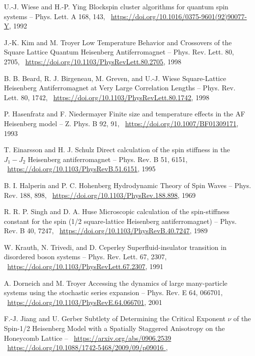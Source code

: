 \documentclass[11pt]{article}
\begin{document}
\begin{thebibliography}{3}
U.-J. Wiese and H.-P. Ying Blockspin cluster algorithms for quantum spin systems -- Phys. Lett. A 168, 143,  ~\url{https://doi.org/10.1016/0375-9601(92)90077-Y}, 1992

J.-K. Kim and M. Troyer Low Temperature Behavior and Crossovers of the Square Lattice Quantum Heisenberg Antiferromagnet -- Phys. Rev. Lett. 80, 2705,  ~\url{https://doi.org/10.1103/PhysRevLett.80.2705}, 1998

B. B. Beard, R. J. Birgeneau, M. Greven, and U.-J. Wiese Square-Lattice Heisenberg Antiferromagnet at Very Large Correlation Lengths -- Phys. Rev. Lett. 80, 1742,  ~\url{https://doi.org/10.1103/PhysRevLett.80.1742}, 1998

P. Hasenfratz and F. Niedermayer Finite size and temperature effects in the AF Heisenberg model -- Z. Phys. B 92, 91,  ~\url{https://doi.org/10.1007/BF01309171}, 1993

T. Einarsson and H. J. Schulz Direct calculation of the spin stiffness in the $J_1-J_2$ Heisenberg antiferromagnet -- Phys. Rev. B 51, 6151,  ~\url{https://doi.org/10.1103/PhysRevB.51.6151}, 1995

B. I. Halperin and P. C. Hohenberg Hydrodynamic Theory of Spin Waves -- Phys. Rev. 188, 898,  ~\url{https://doi.org/10.1103/PhysRev.188.898}, 1969

R. R. P. Singh and D. A. Huse Microscopic calculation of the spin-stiffness constant for the spin (1/2 square-lattice Heisenberg antiferromagnet) -- Phys. Rev. B 40, 7247,  ~\url{https://doi.org/10.1103/PhysRevB.40.7247}, 1989

W. Krauth, N. Trivedi, and D. Ceperley 
Superfluid-insulator transition in disordered boson systems -- Phys. Rev. Lett. 67, 2307,  ~\url{https://doi.org/10.1103/PhysRevLett.67.2307}, 1991

A. Dorneich and M. Troyer Accessing the dynamics of large many-particle systems using the stochastic series expansion -- Phys. Rev. E 64, 066701, ~\url{https://doi.org/10.1103/PhysRevE.64.066701},  2001

F.-J. Jiang and U. Gerber Subtlety of Determining the Critical Exponent $\nu$ of the Spin-1/2 Heisenberg Model with a Spatially Staggered Anisotropy on the Honeycomb Lattice -- ~\url{https://arxiv.org/abs/0906.2539} ~\url{https://doi.org/10.1088/1742-5468/2009/09/p09016 }, 


\end{thebibliography}
\end{document}
